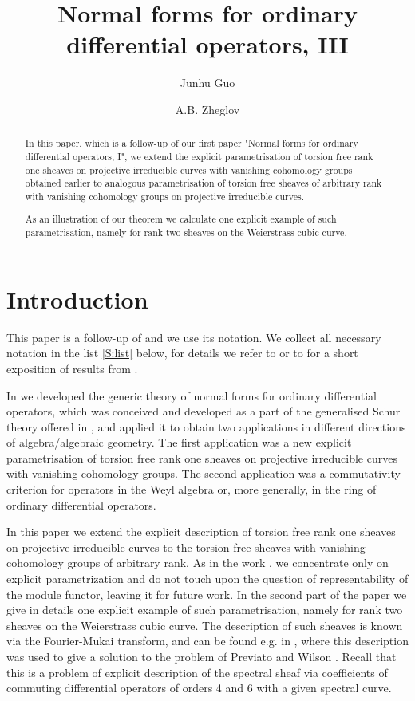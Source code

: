 \documentclass[11pt]{article}
\theoremstyle{definition}
\theoremstyle{plain}
\numberwithin{equation}{section}
\begin{document}
\title{Normal forms for ordinary differential operators, III}
\author{Junhu Guo \and A.B. Zheglov}
\date{}
\maketitle





\begin{abstract}
In this paper, which is  a follow-up of our first paper "Normal forms for ordinary differential operators, I", we extend the  explicit parametrisation of torsion free rank one sheaves on projective irreducible curves with vanishing cohomology groups obtained earlier to analogous parametrisation of torsion free sheaves of arbitrary rank with vanishing cohomology groups  on projective irreducible curves.

As an illustration of our theorem we calculate one explicit example of such parametrisation, namely for rank two sheaves on the Weierstrass cubic curve.   

\end{abstract}

\tableofcontents


\section{Introduction}

This paper is a follow-up of \cite{GZ24} and we use its notation. We collect all necessary notation in the list \ref{S:list} below, for details we refer to  \cite{GZ24} or to \cite[Sec. 2]{Zheglov25} for a short exposition of results from \cite{GZ24}.

In \cite{GZ24} we developed the generic theory of normal forms for ordinary differential operators, which was conceived and developed as a part of the generalised Schur theory offered in \cite{A.Z}, and applied it to obtain two applications in different directions of algebra/algebraic geometry. The first application was a new explicit parametrisation of torsion free rank one sheaves on projective irreducible curves with vanishing cohomology groups. 
The second application was a commutativity criterion for operators in the Weyl algebra or, more generally, in the ring of ordinary differential operators.

In this paper we extend the explicit description of torsion free rank one sheaves on projective irreducible curves to the torsion free sheaves with vanishing cohomology groups of arbitrary rank. As in the work \cite{GZ24}, we concentrate only on explicit parametrization and do not touch upon the question of representability of the module functor, leaving it for future work. In the second part of the paper we give in details one explicit example of such parametrisation, namely for rank two sheaves on the Weierstrass cubic curve.  
The description of such sheaves is known via the Fourier-Mukai transform, and can be found e.g. in \cite{BZ}, where this description was used to give a solution to the problem of Previato and Wilson  \cite{PW}. Recall that this is a problem of explicit description of the spectral sheaf via coefficients of commuting differential operators of orders 4 and 6 with a given spectral curve.  
\end{document}
